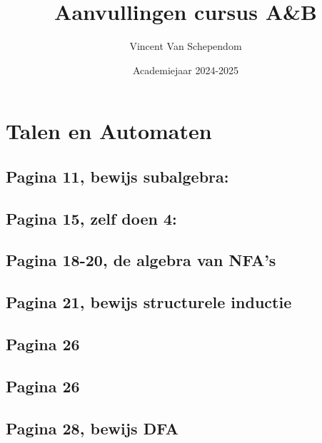 \documentclass[kulak]{kulakarticle}
\title{Aanvullingen cursus A\&B}
\author{Vincent Van Schependom}
\date{Academiejaar 2024-2025}
\theoremstyle{definition}
\begin{document}
	\maketitle

	\setcounter{section}{1}

	\section{Talen en Automaten}

	\subsection*{Pagina 11, bewijs subalgebra:}

	

	\subsection*{Pagina 15, zelf doen 4:}

	

	\subsection*{Pagina 18-20, de algebra van NFA's}

	

	\subsection*{Pagina 21, bewijs structurele inductie}

	

	\subsection*{Pagina 26}

	

	\subsection*{Pagina 26}

	

	\newpage
	\subsection*{Pagina 28, bewijs DFA}
\end{document}
